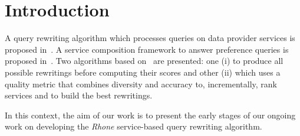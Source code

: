 \section{Introduction}

 

A query rewriting algorithm which processes queries on data provider services is
proposed in~\cite{Barhamgi2010}. A service composition framework to answer
preference queries is proposed in~\cite{Benouaret2011}. Two algorithms based on~\cite{Barhamgi2010} are
presented: one (i) to produce all possible rewritings before computing their scores and other (ii)
which uses a quality metric that combines diversity and accuracy to,
incrementally, rank services and to build the best rewritings.

In this context, the aim of our work is to present the early stages of our
ongoing work on developing the \textit{Rhone} service-based query rewriting
algorithm.

